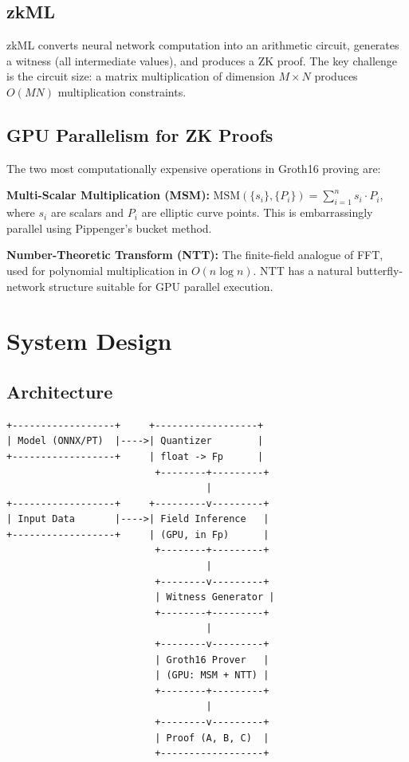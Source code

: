 \documentclass[11pt,a4paper]{article}
\begin{document}
\subsection{zkML}

zkML converts neural network computation into an arithmetic circuit,
generates a witness (all intermediate values), and produces a ZK proof.
The key challenge is the circuit size: a matrix multiplication of
dimension $M \times N$ produces $O(MN)$ multiplication constraints.

\subsection{GPU Parallelism for ZK Proofs}

The two most computationally expensive operations in Groth16 proving are:

\textbf{Multi-Scalar Multiplication (MSM):}
$\text{MSM}(\{s_i\}, \{P_i\}) = \sum_{i=1}^n s_i \cdot P_i$,
where $s_i$ are scalars and $P_i$ are elliptic curve points.
This is embarrassingly parallel using Pippenger's bucket method.

\textbf{Number-Theoretic Transform (NTT):}
The finite-field analogue of FFT, used for polynomial multiplication
in $O(n \log n)$. NTT has a natural butterfly-network structure
suitable for GPU parallel execution.

\section{System Design}

\subsection{Architecture}

\begin{verbatim}
+------------------+     +------------------+
| Model (ONNX/PT)  |---->| Quantizer        |
+------------------+     | float -> Fp      |
                          +--------+---------+
                                   |
+------------------+     +---------v---------+
| Input Data       |---->| Field Inference   |
+------------------+     | (GPU, in Fp)      |
                          +--------+---------+
                                   |
                          +--------v---------+
                          | Witness Generator |
                          +--------+---------+
                                   |
                          +--------v---------+
                          | Groth16 Prover   |
                          | (GPU: MSM + NTT) |
                          +--------+---------+
                                   |
                          +--------v---------+
                          | Proof (A, B, C)  |
                          +------------------+
\end{verbatim}
\end{document}
